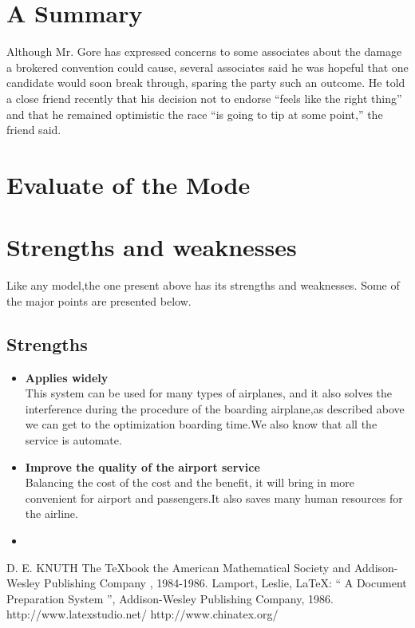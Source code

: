 \section{A Summary    }
Although Mr. Gore has expressed concerns to some associates about
the damage a brokered convention could cause, several associates
said he was hopeful that one candidate would soon break through,
sparing the party such an outcome. He told a close friend recently
that his decision not to endorse ``feels like the right thing''
and that he remained optimistic the race ``is going to tip at some
point,'' the friend said.
\section{Evaluate of the Mode}

\section{Strengths and weaknesses}
Like any model,the one present above has its strengths and
weaknesses. Some of the major points are presented below.

\subsection{Strengths}
\begin{itemize}
\item \textbf{Applies widely}\\
This  system can be used for many types of airplanes, and it also
solves the interference during  the procedure of the boarding
airplane,as described above we can get to the  optimization
boarding time.We also know that all the service is automate.
\item \textbf{Improve the quality of the airport service}\\
Balancing the cost of the cost and the benefit, it will bring in
more convenient  for airport and passengers.It also saves many
human resources for the airline. \item \textbf{}
\end{itemize}




\begin{thebibliography}{99}
 D. E. KNUTH   The \TeX{}book  the American
Mathematical Society and Addison-Wesley
Publishing Company , 1984-1986.
Lamport, Leslie,  \LaTeX{}: `` A Document Preparation System '',
Addison-Wesley Publishing Company, 1986.
http://www.latexstudio.net/
http://www.chinatex.org/
\end{thebibliography}

